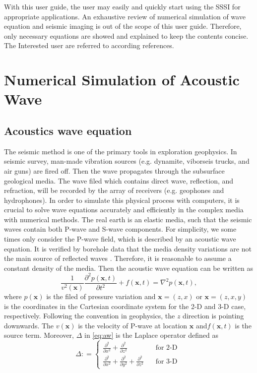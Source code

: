 \documentclass[11pt]{article}
\newcommand{\bx}{\boldsymbol{x}}
\theoremstyle{plain}
\theoremstyle{definition}
\theoremstyle{remark}
\numberwithin{equation}{section}
\begin{document}
With this user guide, the user may easily and quickly start using the SSSI for appropriate applications. An exhaustive review of numerical simulation of wave equation and seismic imaging is out of the scope of this user guide. Therefore, only necessary equations are showed and explained to keep the contents concise. The Interested user are referred to according references.  

\section{Numerical Simulation of Acoustic Wave}

\subsection{Acoustics wave equation}
The seismic method is one of the primary tools in exploration geophysics. In seismic survey, man-made vibration sources (e.g. dynamite, viborseis trucks, and air guns) are fired off. Then the wave propagates through the subsurface geological media. The wave filed which contains direct wave, reflection, and refraction, will be recorded by the array of receivers (e.g. geophones and hydrophones). In order to simulate this physical process with computers, it is crucial to solve wave equations  accurately and efficiently in the complex media with numerical methods. The real earth is an elastic media, such that the seismic waves contain both P-wave and S-wave components. For simplicity, we some times only consider the P-wave field, which is described by an acoustic wave equation. It is verified by borehole data that the media density variations are not the main source of reflected waves \cite{Hood:1981aa}. Therefore, it is reasonable to assume a constant density of the media. Then the acoustic wave equation can be written as
\begin{equation}\label{eq:aw}
\frac{1}{v^2(\bx)}\frac{\partial^2 p(\bx, t)}{\partial t^2} + f(\bx, t) = \nabla^2 p(\bx, t),
\end{equation}
where $p(\bx)$ is the filed of pressure variation and $\bx=(z,x)$ or $\bx=(z,x,y)$ is the coordinates in the Cartesian coordinate system for the 2-D and 3-D case, respectively. Following the convention in geophysics, the $z$ direction is pointing downwards. The $v(\bx)$ is the velocity of P-wave at location $\bx$ and$f(\bx,t)$ is the source term. Moreover, $\Delta$ in \eqref{eq:aw} is the Laplace operator defined as 
\begin{equation}
\Delta: =\left\{
\begin{aligned}
\frac{\partial^2}{\partial x^2}+\frac{\partial^2}{\partial z^2}~~~~~~~ & ~~~~\text{for 2-D }\\
\frac{\partial^2}{\partial x^2}+\frac{\partial^2}{\partial y^2}+\frac{\partial^2}{\partial z^2} &~~~~ \text{for 3-D}
\end{aligned}
\right.  
\end{equation}
\end{document}
